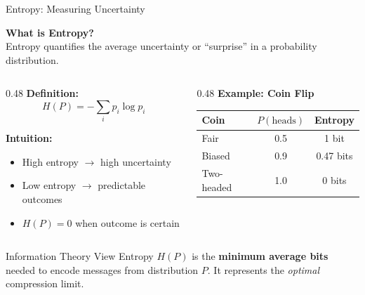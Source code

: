 \documentclass[xcolor=svgnames, 8pt, handout, standalone]{beamer}
\newcommand{\1}{\mathbf{1}}
\begin{document}
\begin{frame}{Entropy: Measuring Uncertainty}

\textbf{What is Entropy?}\\[0.5em]
Entropy quantifies the \textcolor{rred}{average uncertainty} or ``surprise'' in a probability distribution.

\pause
\vspace{0.5em}

\begin{columns}[T]
\begin{column}{0.48\textwidth}
\textbf{Definition:}
$$H(P) = -\sum_{i} p_i \log p_i$$

\pause
\textbf{Intuition:}
\begin{itemize}
    \item High entropy $\rightarrow$ high uncertainty
    \item Low entropy $\rightarrow$ predictable outcomes
    \item $H(P) = 0$ when outcome is certain
\end{itemize}
\end{column}

\pause
\begin{column}{0.48\textwidth}
\textbf{Example: Coin Flip}\\[0.3em]
\begin{tabular}{lcc}
\toprule
\textbf{Coin} & \textbf{$P(\text{heads})$} & \textbf{Entropy} \\
\midrule
Fair & 0.5 & 1 bit \\
Biased & 0.9 & 0.47 bits \\
Two-headed & 1.0 & 0 bits \\
\bottomrule
\end{tabular}
\end{column}
\end{columns}

\pause
\vspace{0.5em}
\begin{block}{Information Theory View}
Entropy $H(P)$ is the \textbf{minimum average bits} needed to encode messages from distribution $P$. It represents the \emph{optimal} compression limit.
\end{block}

\end{frame}
\end{document}
